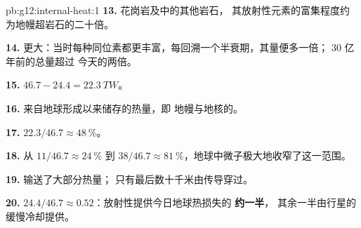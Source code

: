 \begin{solution}{pb:g12:internal-heat:1}
\textbf{13.} 花岗岩及中的其他岩石，
其放射性元素的富集程度约为地幔超岩石的二十倍。

\textbf{14.} 更大：当时每种同位素都更丰富，每回溯一个半衰期，其量便多一倍；
30 亿年前的总量超过
今天的两倍。

\textbf{15.} $46.7 - 24.4 = \qty{22.3}{TW}$。

\textbf{16.} 来自地球形成以来储存的热量，即
地幔与地核的。

\textbf{17.} $22.3/46.7 \approx \qty{48}{\percent}$。

\textbf{18.} 从 $11/46.7 \approx \qty{24}{\percent}$ 到 $38/46.7 \approx
\qty{81}{\percent}$，地球中微子极大地收窄了这一范围。

\textbf{19.} 输送了大部分热量；
只有最后数十千米由传导穿过。

\textbf{20.} $24.4/46.7 \approx 0.52$：放射性提供今日地球热损失的
\textbf{约一半}，
其余一半由行星的缓慢冷却提供。
\end{solution}
